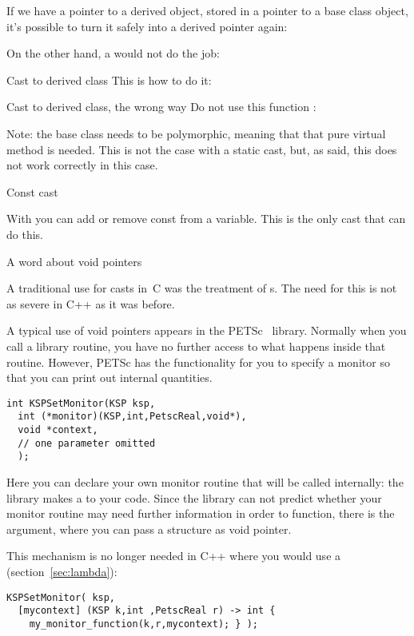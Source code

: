 If we have a pointer to a derived object, stored in a pointer to a
base class object, it's possible to turn it safely into a derived
pointer again:
%

On the other hand, a  would not do the job:
%

\begin{slide}{Cast to derived class}
  \label{sl:dyn-cast}
  This is how to do it:
\end{slide}
\begin{slide}{Cast to derived class, the wrong way}
  \label{sl:dyn-cast-wrong}
  Do not use this function :
\end{slide}

Note: the base class needs to be polymorphic, meaning that that pure
virtual method is needed. This is not the case with a static cast,
but, as said, this does not work correctly in this case.

 {Const cast}

With  you can add or remove const from a
variable. This is the only cast that can do this.

 {A word about void pointers}

A traditional use for casts in~C was the treatment of
s. The need for this is not as severe in
C++ as it was before.

A typical use of void pointers appears in the
PETSc~\cite{petsc-efficient,petsc-home-page} library. Normally when
you call a library routine, you have no further access to what happens
inside that routine. However, PETSc has the functionality for you to
specify a monitor so that you can print out internal quantities.
\begin{verbatim}
int KSPSetMonitor(KSP ksp,
  int (*monitor)(KSP,int,PetscReal,void*),
  void *context,
  // one parameter omitted
  );
\end{verbatim}
Here you can declare your own monitor routine that will be called
internally: the library makes a  to your code.
Since the library can not predict whether your monitor routine may
need further information in order to function, there is the
 argument, where you can pass a structure as void pointer.

This mechanism is no longer needed in C++ where you would use a
 (section~\ref{sec:lambda}):
\begin{verbatim}
KSPSetMonitor( ksp,
  [mycontext] (KSP k,int ,PetscReal r) -> int {
    my_monitor_function(k,r,mycontext); } );
\end{verbatim}


